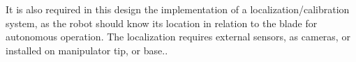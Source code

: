 

It is also required in this design the implementation of a
localization/calibration system, as the robot should know its location in
relation to the blade for autonomous operation. The localization requires
external sensors, as cameras, or installed on manipulator tip, or base..




